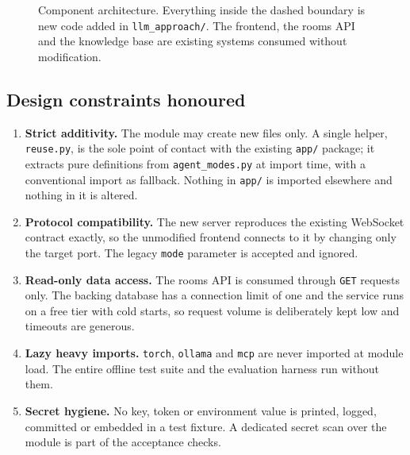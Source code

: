 \documentclass[11pt,a4paper]{article}
\newcommand{\fn}[1]{\texttt{\small #1}}
\begin{document}
\begin{figure}[H]
\caption{Component architecture. Everything inside the dashed boundary is new code added in
\fn{llm\_approach/}. The frontend, the rooms API and the knowledge base are existing systems
consumed without modification.}
\label{fig:arch}
\end{figure}

\subsection{Design constraints honoured}

\begin{enumerate}[leftmargin=1.6em,itemsep=2pt]
\item \textbf{Strict additivity.} The module may create new files only. A single helper,
\fn{reuse.py}, is the sole point of contact with the existing \fn{app/} package; it extracts
pure definitions from \fn{agent\_modes.py} at import time, with a conventional import as
fallback. Nothing in \fn{app/} is imported elsewhere and nothing in it is altered.

\item \textbf{Protocol compatibility.} The new server reproduces the existing WebSocket
contract exactly, so the unmodified frontend connects to it by changing only the target port.
The legacy \fn{mode} parameter is accepted and ignored.

\item \textbf{Read-only data access.} The rooms API is consumed through \fn{GET} requests
only. The backing database has a connection limit of one and the service runs on a free tier
with cold starts, so request volume is deliberately kept low and timeouts are generous.

\item \textbf{Lazy heavy imports.} \fn{torch}, \fn{ollama} and \fn{mcp} are never imported at
module load. The entire offline test suite and the evaluation harness run without them.

\item \textbf{Secret hygiene.} No key, token or environment value is printed, logged,
committed or embedded in a test fixture. A dedicated secret scan over the module is part of
the acceptance checks.
\end{enumerate}
\end{document}
